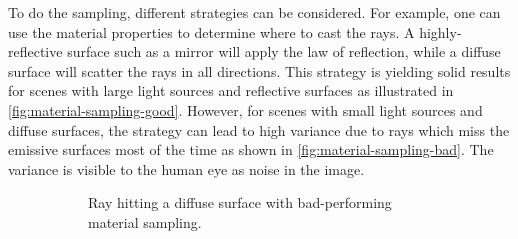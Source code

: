 To do the sampling, different strategies can be considered. For example, one can use the material properties to determine where to cast the rays. A highly-reflective surface such as a mirror will apply the law of reflection, while a diffuse surface will scatter the rays in all directions. This strategy is yielding solid results for scenes with large light sources and reflective surfaces as illustrated in \autoref{fig:material-sampling-good}. However, for scenes with small light sources and diffuse surfaces, the strategy can lead to high variance due to rays which miss the emissive surfaces most of the time as shown in \autoref{fig:material-sampling-bad}. The variance is visible to the human eye as noise in the image.

\begin{figure}[H]
  \centering
  \begin{subfigure}[t]{0.45\textwidth}
    \caption{Ray hitting a diffuse surface with bad-performing material sampling.}
    \label{fig:material-sampling-bad}
  \end{subfigure}
  \hfill
  \begin{subfigure}[t]{0.45\textwidth}
\end{subfigure}
\end{figure}

